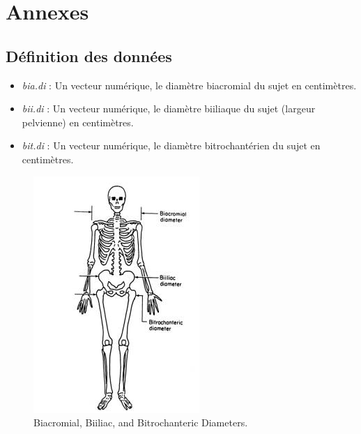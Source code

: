 \documentclass[
]{article}
\providecommand{\tightlist}{%
  \setlength{\itemsep}{0pt}\setlength{\parskip}{0pt}}
\begin{document}
\hypertarget{annexes}{%
\section{Annexes}\label{annexes}}

\hypertarget{duxe9finition-des-donnuxe9es}{%
\subsection{Définition des données}\label{duxe9finition-des-donnuxe9es}}

\begin{itemize}
\tightlist
\item
  \emph{bia.di} : Un vecteur numérique, le diamètre biacromial du sujet
  en centimètres.
\item
  \emph{bii.di} : Un vecteur numérique, le diamètre biiliaque du sujet
  (largeur pelvienne) en centimètres.
\item
  \emph{bit.di} : Un vecteur numérique, le diamètre bitrochantérien du
  sujet en centimètres.
\end{itemize}

\begin{figure}
\centering
\includegraphics{johnson_figure2.jpg}
\caption{Biacromial, Biiliac, and Bitrochanteric Diameters.}
\end{figure}
\end{document}
